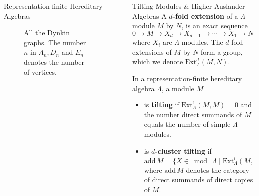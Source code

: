 \documentclass[final]{beamer}
\newlength{\sepwidth}
\newlength{\colwidth}
\newcommand{\separatorcolumn}{\begin{column}{\sepwidth}\end{column}}
\begin{document}
\begin{frame}[t]
\begin{columns}[t]
\begin{column}{\colwidth}
\begin{block}{Representation-finite Hereditary Algebras}
\begin{figure}[h]
     \caption{All the Dynkin graphs. The number $n$ in $A_n, D_n$ and $E_n$
     denotes the number of vertices.}
     \label{fig:dynkin-graphs}
    \end{figure}
  \end{block}
\end{column}

\separatorcolumn

\begin{column}{\colwidth}
  \begin{block}{Tilting Modules \& Higher Auslander Algebras}
    A \textbf{$d$-fold extension} of a $\Lambda$-module $M$ by $N$, is an exact
    sequence
    \[
     0 \longrightarrow M \longrightarrow X_d \longrightarrow X_{d-1}
     \longrightarrow \cdots \longrightarrow X_1 \longrightarrow N
     \longrightarrow 0,
    \]
    where $X_i$ are $\Lambda$-modules. The $d$-fold extensions of $M$ by $N$
    form a group, which we denote $\mathrm{Ext}^{d}_{\Lambda}(M,N)$.

    In a representation-finite hereditary algebra $\Lambda$, a module $M$
    \begin{itemize}
     \vspace*{-12pt}
     \item is \textbf{tilting} if $\mathrm{Ext}^{1}_{\Lambda}(M,M) = 0$ and the
     number direct summands of $M$ equals the number of simple
     $\Lambda$-modules.
     \item is \textbf{$d$-cluster tilting} if
      \[
       \mathrm{add} \, M = \{X \in \bmod \, \Lambda \mid
       \mathrm{Ext}^{i}_{\Lambda}(M,X) = 0 \; \forall i \in \{1,\ldots,d-1\}\},
      \]
      where $\mathrm{add} \, M$ denotes the category of direct summands of
      direct copies of $M$.
    \end{itemize}


\end{block}
\end{column}
\end{columns}
\end{frame}
\end{document}
